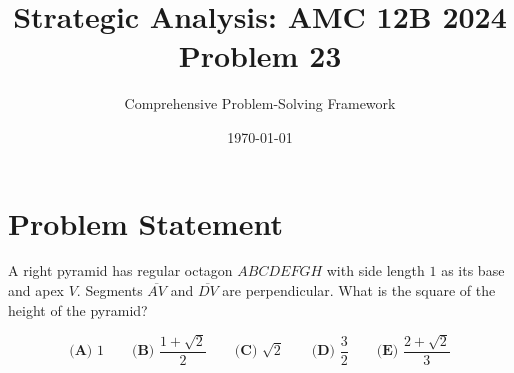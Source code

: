 \documentclass[12pt]{article}
\begin{document}
\title{\textbf{Strategic Analysis: AMC 12B 2024 Problem 23}}
\author{Comprehensive Problem-Solving Framework}
\date{\today}
\maketitle

\section*{Problem Statement}

A right pyramid has regular octagon $ABCDEFGH$ with side length $1$ as its base and apex $V$. Segments $\overline{AV}$ and $\overline{DV}$ are perpendicular. What is the square of the height of the pyramid?

$$\textbf{(A) } 1 \qquad \textbf{(B) } \frac{1+\sqrt{2}}{2} \qquad \textbf{(C) } \sqrt{2} \qquad \textbf{(D) } \frac{3}{2} \qquad \textbf{(E) } \frac{2+\sqrt{2}}{3}$$

\vspace{1cm}
\end{document}
